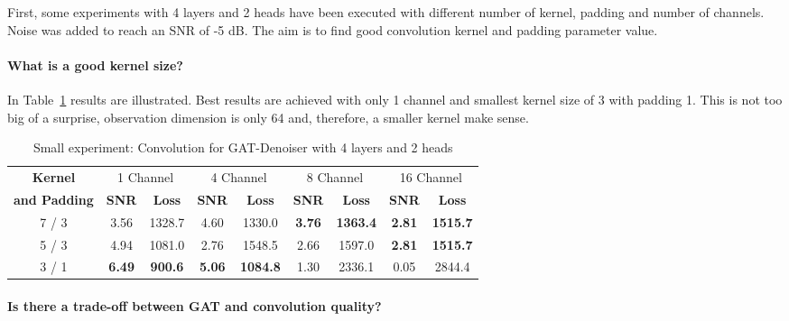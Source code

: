 First, some experiments with 4 layers and 2 heads have been executed with different number of kernel, padding and number of channels.
Noise was added to reach an SNR of -5 dB.
The aim is to find good convolution kernel and padding parameter value.

\paragraph{What is a good kernel size?}

In Table~\ref{tab:small_convolution} results are illustrated. 
Best results are achieved with only 1 channel and smallest kernel size of 3 with padding 1.
This is not too big of a surprise, observation dimension is only 64 and, therefore, a smaller kernel make sense.


\begin{table}[H]
  \centering
  \begin{tabular}{c|cc|cc|cc|cc}
    \toprule
    \textbf{Kernel}  & \multicolumn{2}{c|}{1 Channel} & \multicolumn{2}{c|}{4 Channel} & \multicolumn{2}{c|}{8 Channel} & \multicolumn{2}{c}{16 Channel} \\
    \textbf{and Padding}  & \textbf{SNR} & \textbf{Loss} & \textbf{SNR} & \textbf{Loss} & \textbf{SNR} & \textbf{Loss} & \textbf{SNR} & \textbf{Loss} \\ 
    \midrule
      7 / 3 & 3.56 & 1328.7                  & 4.60  &  1330.0                   & \textbf{3.76} & \textbf{1363.4} & \textbf{2.81}  & \textbf{1515.7} \\ \hline
      5 / 3 & 4.94 & 1081.0                  & 2.76  &  1548.5                   & 2.66 & 1597.0                   & \textbf{2.81}  & \textbf{1515.7} \\ \hline
      3 / 1 & \textbf{6.49} & \textbf{900.6} & \textbf{5.06}  &  \textbf{1084.8} & 1.30 & 2336.1                   & 0.05  & 2844.4 \\

    \midrule
  \end{tabular}

  \caption{Small experiment: Convolution for GAT-Denoiser with 4 layers and 2 heads}
  \label{tab:small_convolution}
\end{table}

\paragraph{Is there a trade-off between GAT and convolution quality?}

